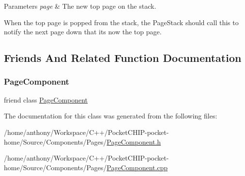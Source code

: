 \begin{DoxyParams}{Parameters}
{\em page} & The new top page on the stack.\\
\hline
\end{DoxyParams}
When the top page is popped from the stack, the Page\+Stack should call this to notify the next page down that it\textquotesingle{}s now the top page. 

\subsection{Friends And Related Function Documentation}
\mbox{\label{classPageComponent_1_1PageStackInterface_ad38036d55f115286c52feb1c6fcf3b39}} 
\subsubsection{\texorpdfstring{Page\+Component}{PageComponent}}
{\footnotesize\ttfamily friend class \mbox{\hyperlink{classPageComponent}{Page\+Component}}\hspace{0.3cm}{\ttfamily [friend]}}



The documentation for this class was generated from the following files\+:\begin{DoxyCompactItemize}
\item 
/home/anthony/\+Workspace/\+C++/\+Pocket\+C\+H\+I\+P-\/pocket-\/home/\+Source/\+Components/\+Pages/\mbox{\hyperlink{PageComponent_8h}{Page\+Component.\+h}}\item 
/home/anthony/\+Workspace/\+C++/\+Pocket\+C\+H\+I\+P-\/pocket-\/home/\+Source/\+Components/\+Pages/\mbox{\hyperlink{PageComponent_8cpp}{Page\+Component.\+cpp}}\end{DoxyCompactItemize}
